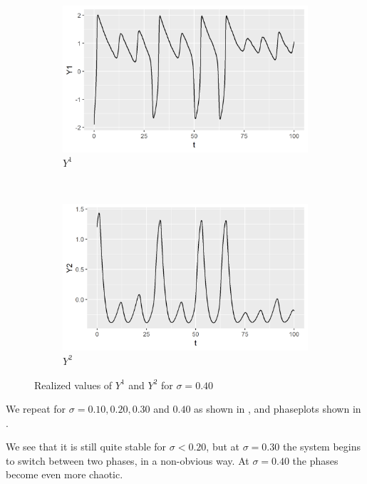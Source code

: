 \documentclass[a4paper]{article}
\begin{document}
\begin{figure}
    \centering
    \begin{subfigure}[b]{0.45\textwidth}
        \includegraphics[width=\textwidth]{part1a-sigma4-Y1.png}
        \caption{$Y^1$}
    \end{subfigure}
    ~
    \begin{subfigure}[b]{0.45\textwidth}
        \includegraphics[width=\textwidth]{part1a-sigma4-Y2.png}
        \caption{$Y^2$}
    \end{subfigure}
    \caption{Realized values of $Y^1$ and $Y^2$ for $\sigma = 0.40$}\label{fig:part1a-sigma4}
\end{figure}
\clearpage

We repeat for $\sigma = 0.10, 0.20, 0.30$ and $0.40$ as shown in , and phaseplots shown in .

We see that it is still quite stable for $\sigma < 0.20$, but at $\sigma = 0.30$ the system begins to switch between two phases, in a non-obvious way. At $\sigma = 0.40$ the phases become even more chaotic.
\end{document}

